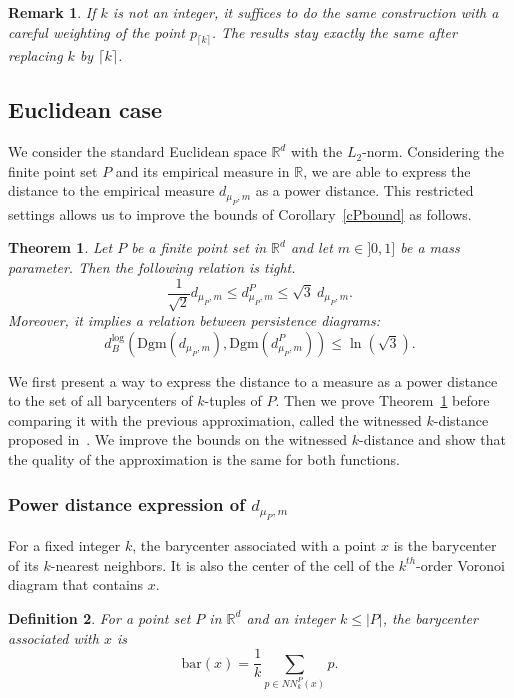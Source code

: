 \documentclass[a4paper]{article}
\newcommand\bary[1]{\mathrm{bar}(#1)}
\newcommand\dmP{d_{\mu_P,m}}
\newcommand\dPP{d_{\mu_P,m}^P}
\newcommand\R{\mathbb{R}}
\newcommand\Dgm[1]{\mathrm{Dgm}(#1)}
\newcommand\dbl{d_B^{\mathrm{log}}}
\newtheorem{theorem}{Theorem}[section]
\newtheorem{definition}[theorem]{Definition}
\newtheorem{remark}{Remark}
\begin{document}
\begin{remark}\label{rkNotInteger}
If $k$ is not an integer, it suffices to do the same construction with a careful weighting of the point $p_{\lceil k\rceil}$.
The results stay exactly the same after replacing $k$ by $\lceil k\rceil$.
\end{remark}

\subsection{Euclidean case}\label{ssEc}

We consider the standard Euclidean space $\R^d$ with the $L_2$-norm.
Considering the finite point set $P$ and its empirical measure in $\R$, we are able to express the distance to the empirical measure $\dmP$ as a power distance. 
This restricted settings allows us to improve the bounds of Corollary~\ref{cPbound} as follows.
\begin{theorem}\label{tPboundEuc}
Let $P$ be a finite point set in $\R^d$ and let $m\in]0,1]$ be a mass parameter.
Then the following relation is tight.
\[
  \frac{1}{\sqrt{2}}\dmP\leq\dPP\leq\sqrt{3}\ \dmP.
\]
Moreover, it implies a relation between persistence diagrams:
\[
  \dbl(\Dgm{\dmP},\Dgm{\dPP})\leq\ln(\sqrt{3}).
\]
\end{theorem}

We first present a way to express the distance to a measure as a power distance to the set of all barycenters of $k$-tuples of $P$.
Then we prove Theorem~\ref{tPboundEuc} before comparing it with the previous approximation, called the witnessed $k$-distance proposed in~\cite{wkdGMM}.
We improve the bounds on the witnessed $k$-distance and show that the quality of the approximation is the same for both functions.

\subsubsection{Power distance expression of $\dmP$}
For a fixed integer $k$, the barycenter associated with a point $x$ is the barycenter of its $k$-nearest neighbors.
It is also the center of the cell of the $k^{th}$-order Voronoi diagram that contains $x$.

\begin{definition}
For a point set $P$ in $\R^d$ and an integer $k\leq|P|$, the \emph{barycenter associated with $x$} is
\[
  \bary{x}=\frac{1}{k}\sum_{p\in NN_k^P(x)} p.
\]
\end{definition}
\end{document}
